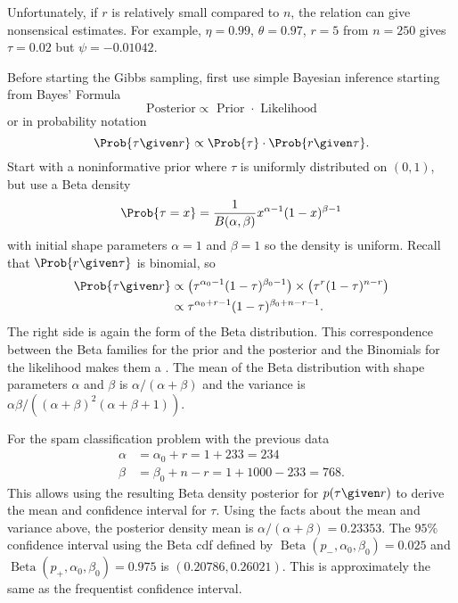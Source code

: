 \documentclass[12pt]{article}
\begin{document}
Unfortunately, if \( r \) is relatively small compared to \( n \), the
relation can give nonsensical estimates.  For example, \( \eta = 0.99 \),
\( \theta = 0.97 \), \( r = 5 \) from \( n = 250 \) gives \( \tau = 0.02
\) but \( \psi = -0.01042 \).

Before starting the Gibbs sampling, first use simple Bayesian inference%
starting from Bayes' Formula%
\[
    \text{ Posterior} \propto \text{ Prior } \cdot \text{ Likelihood }
\] or in probability notation
\[
    \Prob{\tau \given r} \propto \Prob{\tau} \cdot \Prob{r \given \tau}.
\] Start with a noninformative prior where \( \tau \) is uniformly
distributed on \( (0,1) \), but use a Beta density%
\[
    \Prob{\tau = x} = \frac{1}{B(\alpha, \beta)} x^{\alpha-1}(1-x)^{\beta-1}
\] with initial shape parameters \( \alpha = 1 \) and \( \beta = 1 \) so
the density is uniform.  Recall that \( \Prob{r \given \tau} \) is
binomial, so
\begin{align*}
    \Prob{\tau \given r} &\propto \left( \tau^{\alpha_0 - 1}(1-\tau)^{\beta_0
    - 1} \right) \times \left( \tau^r (1 - \tau)^{n-r} \right) \\
    &\propto \tau^{\alpha_0 + r -1} (1-\tau)^{\beta_0 + n - r -1}.
\end{align*}
The right side is again the form of the Beta distribution. This
correspondence between the Beta families for the prior and the posterior
and the Binomials for the likelihood makes them a .%
%
The mean of the Beta distribution with shape parameters \( \alpha \) and
\( \beta \) is \( \alpha/(\alpha + \beta) \) and the variance is \(
\alpha \beta/((\alpha + \beta)^2(\alpha + \beta + 1)) \).

For the spam classification problem with the previous data
\begin{align*}
    \alpha &= \alpha_0 + r = 1 + 233 = 234 \\
    \beta &= \beta_0 + n -r = 1 + 1000 - 233 = 768.
\end{align*}
This allows using the resulting Beta density posterior for \( p(\tau
\given r) \) to derive the mean and confidence interval for \( \tau \).
Using the facts about the mean and variance above, the posterior density
mean is \( \alpha/(\alpha + \beta) = 0.23353 \).  The \( 95\% \)
confidence interval using the Beta cdf defined by \(
\operatorname{Beta}
(p_{-}, \alpha_0, \beta_0) = 0.025 \) and \(
\operatorname{Beta}
(p_{+}, \alpha_0, \beta_0) = 0.975 \) is \( (0.20786, 0.26021) \).  This
is approximately the same as the frequentist confidence interval.
\end{document}
